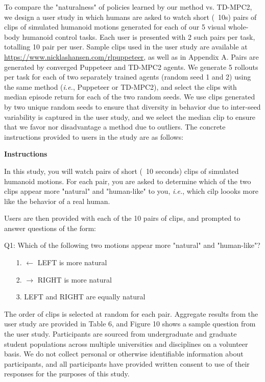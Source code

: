 \documentclass[sn-mathphys-num]{sn-jnl}%
\theoremstyle{thmstyleone}	%
\theoremstyle{thmstyletwo}	%
\theoremstyle{thmstylethree}	%
\begin{document}
To compare the "naturalness" of policies learned by our method vs. TD-MPC2, 
we design a user study in which humans are asked to watch short (~10s) pairs of clips of simulated humanoid motions generated for each of our 5 visual whole-body humanoid control tasks.
Each user is presented with 2 such pairs per task, totalling 10 pair per user.
Sample clips used in the user study are available at \href{https://www.nicklashansen.com/rlpuppeteer}{https://www.nicklashansen.com/rlpuppeteer}, as well as in Appendix A.
Pairs are generated by converged Puppeteer and TD-MPC2 agents.
We generate 5 rollouts per task for each of two separately trained agents (random seed 1 and 2) using the same method (\textit{i.e.}, Puppeteer or TD-MPC2), 
and select the clips with median episode return for each of the two random seeds.
We use clips generated by two unique random seeds to ensure that diversity in behavior due to inter-seed variability is captured in the user study,
and we select the median clip to ensure that we favor nor disadvantage a method due to outliers.
The concrete instructions provided to users in the study are as follows:

\textbf{Instructions}

In this study, you will watch pairs of short (~10 seconds) clips of simulated humanoid motions.
For each pair, you are asked to determine which of the two clips appear more "natural" and "human-like" to you, \textit{i.e.}, which cilp loooks more like the behavior of a real human.

Users are then provided with each of the 10 pairs of clips, 
and prompted to answer questions of the form:


Q1: Which of the following two motions appear more "natural" and "human-like"?

\begin{itemize}
	\item[1.] 
	$ \leftarrow $ LEFT is more natural
	\item[2.]
	$ \rightarrow $ RIGHT is more natural
	\item[3.]
	LEFT and RIGHT are equally natural
\end{itemize}

The order of clips is selected at random for each pair.
Aggregate results from the user study are provided in Table 6, 
and Figure 10 shows a sample question from the user study.
Participants are sourced from undergraduate and graduate student populations across multiple universities and disciplines on a volunteer basis.
We do not collect personal or otherwise identifiable information about participants,
and all participants have provided written consent to use of their responses for the purposes of this study.
\end{document}
